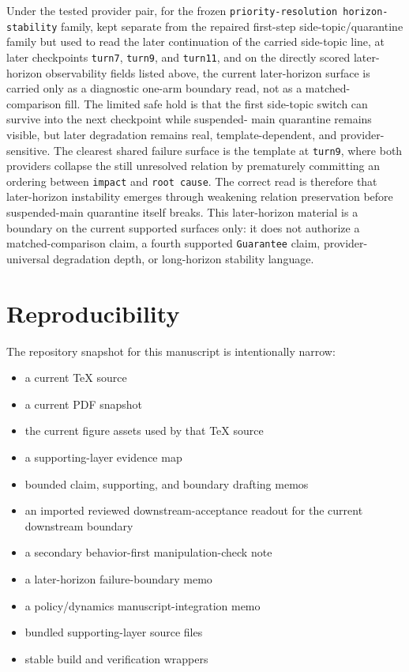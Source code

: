\documentclass[11pt]{article}
\renewcommand{\_}{\textunderscore\hspace{0pt}}
\renewenvironment{quote}
  {\list{}{\leftmargin1em\rightmargin1em}\item\relax\small\sloppy}
  {\endlist}
\newcommand{\code}[1]{\path{#1}}
\begin{document}
\begin{quote}
Under the tested provider pair, for the frozen
\texttt{priority-resolution horizon-stability} family, kept separate from the
repaired first-step side-topic/quarantine family but used to read the later
continuation of the carried side-topic line, at later checkpoints
\texttt{turn7}, \texttt{turn9}, and \texttt{turn11}, and on the directly scored
later-horizon observability fields listed above, the
current later-horizon surface is carried only as a diagnostic one-arm boundary
read, not as a matched-comparison fill. The limited safe hold is that the
first side-topic switch can survive into the next checkpoint while suspended-
main quarantine remains visible, but later degradation remains real,
template-dependent, and provider-sensitive. The clearest shared failure surface
is the \code{C_incident_response} template at \texttt{turn9}, where both providers
collapse the still unresolved relation by prematurely committing an ordering
between \texttt{impact} and \texttt{root cause}. The correct read is therefore
that later-horizon instability emerges through weakening relation preservation
before suspended-main quarantine itself breaks. This later-horizon material is
a boundary on the current supported surfaces only: it does not authorize a
matched-comparison claim, a fourth supported \texttt{Guarantee} claim,
provider-universal degradation depth, or long-horizon stability language.
\end{quote}

\section{Reproducibility}

The repository snapshot for this manuscript is intentionally narrow:
\begin{itemize}
\item a current TeX source
\item a current PDF snapshot
\item the current figure assets used by that TeX source
\item a supporting-layer evidence map
\item bounded claim, supporting, and boundary drafting memos
\item an imported reviewed downstream-acceptance readout for the
current downstream boundary
\item a secondary behavior-first manipulation-check note
\item a later-horizon failure-boundary memo
\item a policy/dynamics manuscript-integration memo
\item bundled supporting-layer source files
\item stable build and verification wrappers
\end{itemize}
\end{document}
